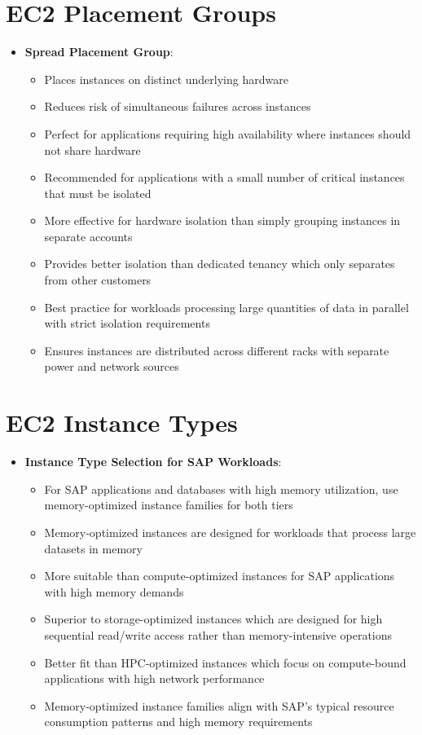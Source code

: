 \documentclass[11pt,a4paper]{report}
\begin{document}
\section{EC2 Placement Groups}

\begin{itemize}
  \item \textbf{Spread Placement Group}:
\begin{itemize}
  \item Places instances on distinct underlying hardware
  \item Reduces risk of simultaneous failures across instances
  \item Perfect for applications requiring high availability where instances should not share hardware
  \item Recommended for applications with a small number of critical instances that must be isolated
  \item More effective for hardware isolation than simply grouping instances in separate accounts
  \item Provides better isolation than dedicated tenancy which only separates from other customers
  \item Best practice for workloads processing large quantities of data in parallel with strict isolation requirements
  \item Ensures instances are distributed across different racks with separate power and network sources
\end{itemize}
\end{itemize}


\section{EC2 Instance Types}

\begin{itemize}
  \item \textbf{Instance Type Selection for SAP Workloads}:
\begin{itemize}
  \item For SAP applications and databases with high memory utilization, use memory-optimized instance families for both tiers
  \item Memory-optimized instances are designed for workloads that process large datasets in memory
  \item More suitable than compute-optimized instances for SAP applications with high memory demands
  \item Superior to storage-optimized instances which are designed for high sequential read/write access rather than memory-intensive operations
  \item Better fit than HPC-optimized instances which focus on compute-bound applications with high network performance
  \item Memory-optimized instance families align with SAP's typical resource consumption patterns and high memory requirements
\end{itemize}
\end{itemize}
\end{document}
